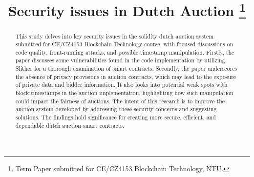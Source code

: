\documentclass[conference]{IEEEtran}
\begin{document}
\title{{Security issues in Dutch Auction}
\thanks{Term Paper submitted for CE/CZ4153 Blockchain Technology, NTU.}
}

\author{
\and
{}
\and
{}
}

\maketitle

\begin{abstract}
This study delves into key security issues in the solidity dutch auction system submitted for CE/CZ4153 Blockchain Technology course, with focused discussions on code quality, front-running attacks, and possible timestamp manipulation. Firstly, the paper discusses some vulnerabilities found in the code implementation by  utilizing Slither for a thorough examination of smart contracts. Secondly, the paper underscores the absence of privacy provisions in auction contracts, which may lead to the exposure of private data and bidder information. It also looks into potential weak spots with block timestamps in the auction implementation, highlighting how such manipulation could impact the fairness of auctions. The intent of this research is to improve the auction system developed by addressing these security concerns and suggesting solutions. The findings hold significance for creating more secure, efficient, and dependable dutch auction smart contracts.

\end{abstract}
\end{document}
